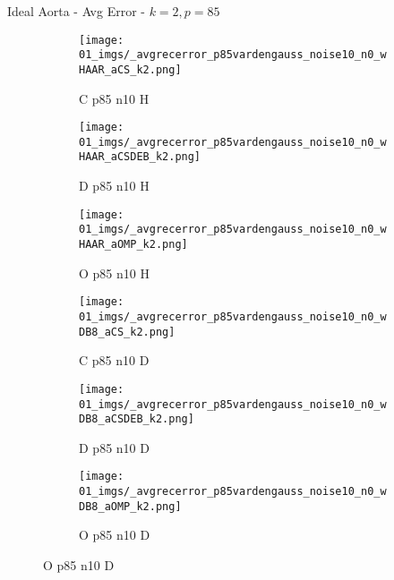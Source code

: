 \begin{frame}{Ideal Aorta - Avg Error - $k=2,p=85$}{}
\begin{figure}
\begin{subfigure}{0.13\textwidth}
\texttt{[image: 01\_imgs/\_avgrecerror\_p85vardengauss\_noise10\_n0\_wHAAR\_aCS\_k2.png]}
\caption*{\tiny C p85 n10 H}
\end{subfigure}
\begin{subfigure}{0.13\textwidth}
\texttt{[image: 01\_imgs/\_avgrecerror\_p85vardengauss\_noise10\_n0\_wHAAR\_aCSDEB\_k2.png]}
\caption*{\tiny D p85 n10 H}
\end{subfigure}
\begin{subfigure}{0.13\textwidth}
\texttt{[image: 01\_imgs/\_avgrecerror\_p85vardengauss\_noise10\_n0\_wHAAR\_aOMP\_k2.png]}
\caption*{\tiny O p85 n10 H}
\end{subfigure}
\begin{subfigure}{0.13\textwidth}
\texttt{[image: 01\_imgs/\_avgrecerror\_p85vardengauss\_noise10\_n0\_wDB8\_aCS\_k2.png]}
\caption*{\tiny C p85 n10 D}
\end{subfigure}
\begin{subfigure}{0.13\textwidth}
\texttt{[image: 01\_imgs/\_avgrecerror\_p85vardengauss\_noise10\_n0\_wDB8\_aCSDEB\_k2.png]}
\caption*{\tiny D p85 n10 D}
\end{subfigure}
\begin{subfigure}{0.13\textwidth}
\texttt{[image: 01\_imgs/\_avgrecerror\_p85vardengauss\_noise10\_n0\_wDB8\_aOMP\_k2.png]}
\caption*{\tiny O p85 n10 D}
\end{subfigure}

\vspace{5pt}


\end{figure}
\end{frame}
